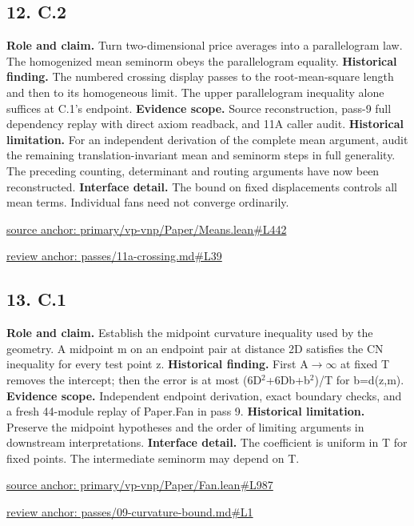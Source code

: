 \documentclass[11pt,letterpaper]{article}
\theoremstyle{definition}\newtheorem{definition}[theorem]{Definition}\newtheorem{example}[theorem]{Example}
\theoremstyle{remark}\newtheorem{remark}[theorem]{Remark}
\begin{document}
\subsection*{12. C.2}
\textbf{Role and claim.} Turn two-dimensional price averages into a parallelogram law. The homogenized mean seminorm obeys the parallelogram equality.
\textbf{Historical finding.} The numbered crossing display passes to the root-mean-square length and then to its homogeneous limit. The upper parallelogram inequality alone suffices at C.1's endpoint.
\textbf{Evidence scope.} Source reconstruction, pass-9 full dependency replay with direct axiom readback, and 11A caller audit.
\textbf{Historical limitation.} For an independent derivation of the complete mean argument, audit the remaining translation-invariant mean and seminorm steps in full generality. The preceding counting, determinant and routing arguments have now been reconstructed.
\textbf{Interface detail.} The bound on fixed displacements controls all mean terms. Individual fans need not converge ordinarily.
\par\href{https://github.com/nousentllc/VP-VNP-Review/blob/8a7976933b6b2b4ffda1ad3a0dfb5fc6b6f023e8/primary/vp-vnp/Paper/Means.lean\#L442}{source anchor: primary/vp-vnp/Paper/Means.lean\#L442}
\par\href{https://github.com/nousentllc/VP-VNP-Review/blob/8a7976933b6b2b4ffda1ad3a0dfb5fc6b6f023e8/passes/11a-crossing.md\#L39}{review anchor: passes/11a-crossing.md\#L39}
\goodbreak
{}
\hypertarget{claim.13}{}
\subsection*{13. C.1}
\textbf{Role and claim.} Establish the midpoint curvature inequality used by the geometry. A midpoint m on an endpoint pair at distance 2D satisfies the CN inequality for every test point z.
\textbf{Historical finding.} First A\ensuremath{\to}\ensuremath{\infty} at fixed T removes the intercept; then the error is at most (6D\ensuremath{{}^2}+6Db+b\ensuremath{{}^2})/T for b=d(z,m).
\textbf{Evidence scope.} Independent endpoint derivation, exact boundary checks, and a fresh 44-module replay of Paper.Fan in pass 9.
\textbf{Historical limitation.} Preserve the midpoint hypotheses and the order of limiting arguments in downstream interpretations.
\textbf{Interface detail.} The coefficient is uniform in T for fixed points. The intermediate seminorm may depend on T.
\par\href{https://github.com/nousentllc/VP-VNP-Review/blob/8a7976933b6b2b4ffda1ad3a0dfb5fc6b6f023e8/primary/vp-vnp/Paper/Fan.lean\#L987}{source anchor: primary/vp-vnp/Paper/Fan.lean\#L987}
\par\href{https://github.com/nousentllc/VP-VNP-Review/blob/8a7976933b6b2b4ffda1ad3a0dfb5fc6b6f023e8/passes/09-curvature-bound.md\#L1}{review anchor: passes/09-curvature-bound.md\#L1}
\goodbreak
{}
\hypertarget{claim.14}{}
\end{document}

